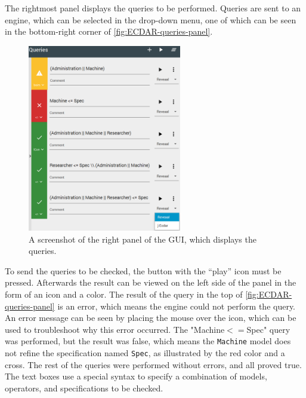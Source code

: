 The rightmost panel displays the queries to be performed. 
Queries are sent to an engine, which can be selected in the drop-down menu, one of which can be seen in the bottom-right corner of \autoref{fig:ECDAR-queries-panel}. 
\begin{figure}[H]
    \centering
    \includegraphics[width=0.6\textwidth]{common/figures/right-panel.png}
    \caption{A screenshot of the right panel of the GUI, which displays the queries.}
    \label{fig:ECDAR-queries-panel}
\end{figure}
To send the queries to be checked, the button with the ``play'' icon must be pressed.
Afterwards the result can be viewed on the left side of the panel in the form of an icon and a color. 
The result of the query in the top of \autoref{fig:ECDAR-queries-panel} is an error, which means the engine could not perform the query. 
An error message can be seen by placing the mouse over the icon, which can be used to troubleshoot why this error occurred.
The "Machine$<=$Spec" query was performed, but the result was false, which means the \texttt{Machine} model does not refine the specification named \texttt{Spec}, as illustrated by the red color and a cross.
The rest of the queries were performed without errors, and all proved true. 
The text boxes use a special syntax to specify a combination of models, operators, and specifications to be checked.

